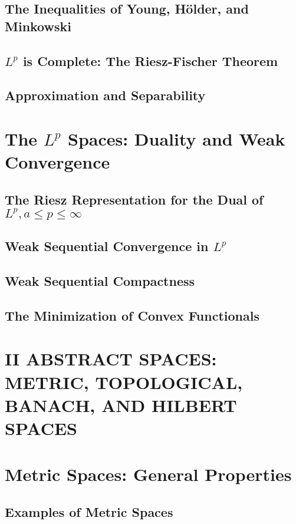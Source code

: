 \documentclass[a4paper,10pt]{book}
\theoremstyle{plain} %
\begin{document}
\section{The Inequalities of Young, H\"older, and Minkowski}
\section{$L^p$ is Complete: The Riesz-Fischer Theorem}
\section{Approximation and Separability}

\chapter{The $L^p$ Spaces: Duality and Weak Convergence}

\section{The Riesz Representation for the Dual of $L^p,a\le p\le \infty$}
\section{Weak Sequential Convergence in $L^p$}
\section{Weak Sequential Compactness}
\section{The Minimization of Convex Functionals}

\setcounter{chapter}{0}
\chapter*{II ABSTRACT SPACES: METRIC, TOPOLOGICAL, BANACH, AND HILBERT SPACES}
\setcounter{chapter}{8}

\chapter{Metric Spaces: General Properties}

\section{Examples of Metric Spaces}
\end{document}
